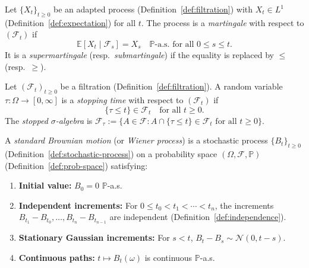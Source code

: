 \begin{definition}[Martingale]
\label{def:martingale}
Let $\{X_t\}_{t \geq 0}$ be an adapted process (Definition~\ref{def:filtration}) with $X_t \in L^1$ (Definition~\ref{def:expectation}) for all $t$.
The process is a \emph{martingale} with respect to $(\mathcal{F}_t)$ if
\[
  \mathbb{E}[X_t \mid \mathcal{F}_s] = X_s \quad \mathbb{P}\text{-a.s.\ for all } 0 \leq s \leq t.
\]
It is a \emph{supermartingale} (resp.\ \emph{submartingale}) if the equality is replaced by $\leq$ (resp.\ $\geq$).
\end{definition}

\begin{definition}
\label{def:stopping-time}
Let $(\mathcal{F}_t)_{t \geq 0}$ be a filtration (Definition~\ref{def:filtration}).
A random variable $\tau : \Omega \to [0, \infty]$ is a \emph{stopping time} with respect to $(\mathcal{F}_t)$ if
\[
  \{\tau \leq t\} \in \mathcal{F}_t \quad \text{for all } t \geq 0.
\]
The \emph{stopped $\sigma$-algebra} is $\mathcal{F}_\tau := \{ A \in \mathcal{F} : A \cap \{\tau \leq t\} \in \mathcal{F}_t \text{ for all } t \geq 0 \}$.
\end{definition}

\begin{definition}
\label{def:brownian-motion}
A \emph{standard Brownian motion} (or \emph{Wiener process}) is a stochastic process $\{B_t\}_{t \geq 0}$ (Definition~\ref{def:stochastic-process}) on a probability space $(\Omega, \mathcal{F}, \mathbb{P})$ (Definition~\ref{def:prob-space}) satisfying:
\begin{enumerate}
  \item \textbf{Initial value:} $B_0 = 0$ $\mathbb{P}$-a.s.
  \item \textbf{Independent increments:} For $0 \leq t_0 < t_1 < \cdots < t_n$, the increments $B_{t_1} - B_{t_0}, \ldots, B_{t_n} - B_{t_{n-1}}$ are independent (Definition~\ref{def:independence}).
  \item \textbf{Stationary Gaussian increments:} For $s < t$, $B_t - B_s \sim \mathcal{N}(0, t-s)$.
  \item \textbf{Continuous paths:} $t \mapsto B_t(\omega)$ is continuous $\mathbb{P}$-a.s.
\end{enumerate}
\end{definition}
